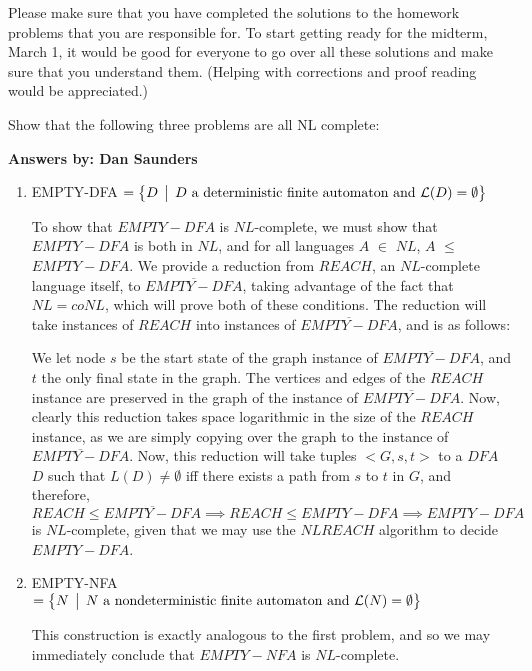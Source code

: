 \documentclass[12pt]{article}
\begin{document}
\thispagestyle{empty}
\noindent{}
\addtocounter{section}{7}

Please make sure that you have completed the solutions to the homework problems that you are
responsible for.   To start getting ready for the midterm, March 1, it would be good for everyone to
go over all these solutions and make sure that you understand them.  (Helping with corrections and
proof reading would be appreciated.)

Show that the following three problems are all NL complete:

\textbf{Answers by: Dan Saunders}

\begin{enumerate}
\item  EMPTY-DFA $ = \bigl\{ D \,\bigm|\, D \mbox{ a deterministic finite automaton and } {\cal L}(D) =
  \emptyset \bigr\}$ 

To show that $EMPTY-DFA$ is $NL$-complete, we must show that $EMPTY-DFA$ is both in $NL$, and for all languages $A$ $\in$ $NL$, $A$ $\leq$ $EMPTY-DFA$. We provide a reduction from $REACH$, an $NL$-complete language itself, to $\overline{EMPTY-DFA}$, taking advantage of the fact that $NL = coNL$, which will prove both of these conditions. The reduction will take instances of $REACH$ into instances of $\overline{EMPTY-DFA}$, and is as follows: 

We let node $s$ be the start state of the graph instance of $\overline{EMPTY-DFA}$, and $t$ the only final state in the graph. The vertices and edges of the $REACH$ instance are preserved in the graph of the instance of $\overline{EMPTY-DFA}$. Now, clearly this reduction takes space logarithmic in the size of the $REACH$ instance, as we are simply copying over the graph to the instance of $\overline{EMPTY-DFA}$. Now, this reduction will take tuples $<G, s, t>$ to a $DFA$ $D$ such that $L(D) \neq \emptyset$ iff there exists a path from $s$ to $t$ in $G$, and therefore, $REACH \leq \overline{EMPTY-DFA} \implies REACH \leq EMPTY-DFA \implies EMPTY-DFA$ is $NL$-complete, given that we may use the $NL REACH$ algorithm to decide $EMPTY-DFA$.

\vspace*{.1in}

\item EMPTY-NFA $ = \bigl\{ N \,\bigm|\, N \mbox{ a nondeterministic finite automaton and } {\cal L}(N) =\emptyset \bigr\}$

This construction is exactly analogous to the first problem, and so we may immediately conclude that $EMPTY-NFA$ is $NL$-complete.


\end{enumerate}
\end{document}
